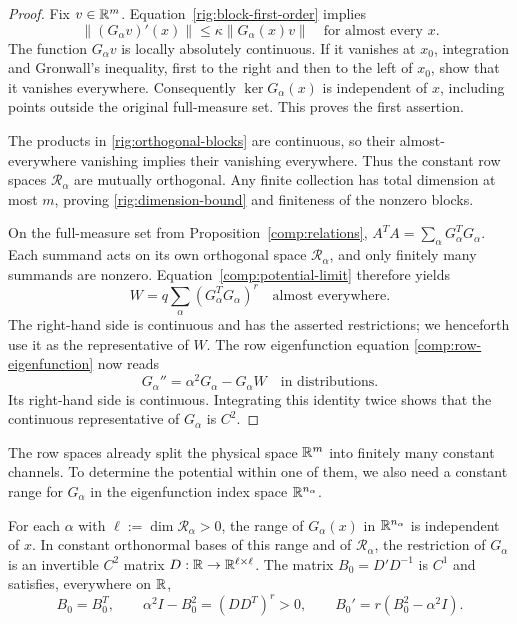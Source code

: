 \begin{proof}
Fix $v\in\mathbb R^m$.  Equation~\eqref{rig:block-first-order} implies
\[
 \|(G_\alpha v)'(x)\|\le\kappa\|G_\alpha(x)v\|
 \quad\text{for almost every }x.
\]
The function $G_\alpha v$ is locally absolutely continuous.  If it
vanishes at $x_0$, integration and Gronwall's inequality, first to the
right and then to the left of $x_0$, show that it vanishes everywhere.
Consequently $\ker G_\alpha(x)$ is independent of $x$, including points
outside the original full-measure set.  This proves the first assertion.

The products in \eqref{rig:orthogonal-blocks} are continuous, so their
almost-everywhere vanishing implies their vanishing everywhere.  Thus the
constant row spaces $\mathcal R_\alpha$ are mutually orthogonal.  Any
finite collection has total dimension at most $m$, proving
\eqref{rig:dimension-bound} and finiteness of the nonzero blocks.

On the full-measure set from Proposition~\ref{comp:relations},
$A^TA=\sum_\alpha G_\alpha^TG_\alpha$.  Each summand acts on its own
orthogonal space $\mathcal R_\alpha$, and only finitely many summands
are nonzero.  Equation~\eqref{comp:potential-limit} therefore yields
\begin{equation}\label{rig:continuous-potential}
 W=q\sum_\alpha(G_\alpha^TG_\alpha)^r
 \quad\text{almost everywhere}.
\end{equation}
The right-hand side is continuous and has the asserted restrictions;
we henceforth use it as the representative of $W$.  The row eigenfunction
equation \eqref{comp:row-eigenfunction} now reads
\begin{equation}\label{rig:block-second-order}
 G_\alpha''=\alpha^2G_\alpha-G_\alpha W
 \quad\text{in distributions}.
\end{equation}
Its right-hand side is continuous.  Integrating this identity twice shows
that the continuous representative of $G_\alpha$ is $C^2$.
\end{proof}

The row spaces already split the physical space $\mathbb R^m$ into finitely
many constant channels.  To determine the potential within one of them,
we also need a constant range for $G_\alpha$ in the eigenfunction index
space $\mathbb R^{n_\alpha}$.

\begin{lemma}\label{rig:fixed-left-spaces}
For each $\alpha$ with $\ell:=\dim\mathcal R_\alpha>0$, the range of
$G_\alpha(x)$ in $\mathbb R^{n_\alpha}$ is independent of $x$.  In constant
orthonormal bases of this range and of $\mathcal R_\alpha$, the
restriction of $G_\alpha$ is an invertible $C^2$ matrix
$D:\mathbb R\to\mathbb R^{\ell\times\ell}$.  The matrix
$B_0=D'D^{-1}$ is $C^1$ and satisfies, everywhere on $\mathbb R$,
\begin{equation}\label{rig:active-identities}
 B_0=B_0^T,\qquad
 \alpha^2I-B_0^2=(DD^T)^r>0,\qquad
 B_0'=r(B_0^2-\alpha^2I).
\end{equation}
\end{lemma}

